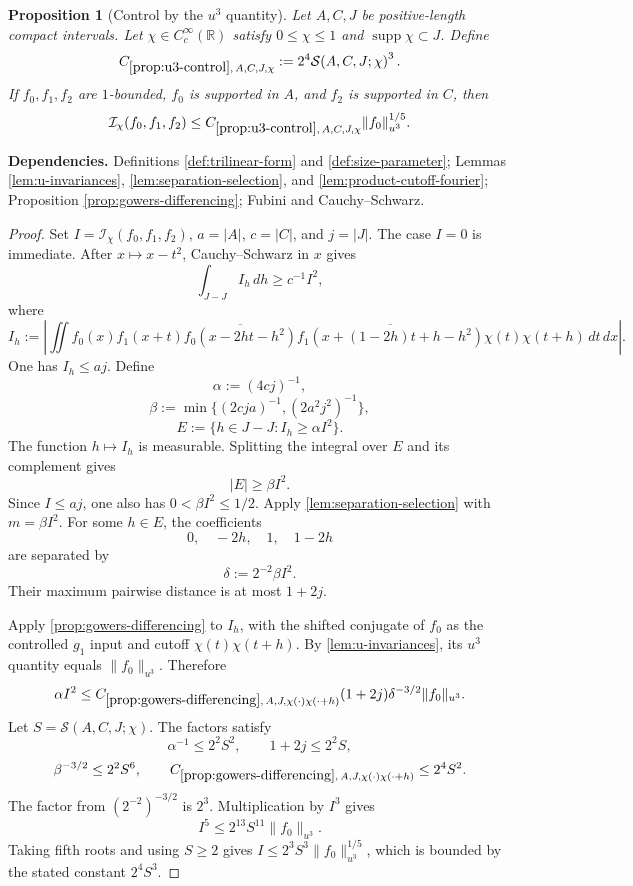 \documentclass[11pt]{article}
\newtheorem{proposition}[proposition]{Proposition}
\theoremstyle{definition}
\theoremstyle{remark}
\newcommand{\R}{\mathbb R}
\newcommand{\supp}{\operatorname{supp}}
\newcommand{\1}{\mathbf 1}
\newcommand{\dd}{\,d}
\newcommand{\Ichi}{\mathcal I_{\chi}}
\newcommand{\uNorm}[2]{\lVert #1\rVert_{u^{#2}}}
\newcommand{\uses}[1]{\par\smallskip\noindent\textbf{Dependencies.} #1\par\smallskip}
\newcommand{\Ssize}[2]{\mathcal S\!\left(#1;#2\right)}
\begin{document}
\begin{proposition}[Control by the $u^3$ quantity]\label{prop:u3-control}
Let $A,C,J$ be positive-length compact intervals.  Let $\chi\in C_c^\infty(\R)$ satisfy $0\leq\chi\leq1$ and $\supp\chi\subset J$.  Define
\[
C_{\ref{prop:u3-control},\,A,C,J,\chi}
:=
2^4\Ssize{A,C,J}{\chi}^{3}.
\]
If $f_0,f_1,f_2$ are $1$-bounded, $f_0$ is supported in $A$, and $f_2$ is supported in $C$, then
\[
\Ichi(f_0,f_1,f_2)
\leq
C_{\ref{prop:u3-control},\,A,C,J,\chi}
\uNorm{f_0}3^{1/5}.
\]
\end{proposition}

\uses{Definitions \ref{def:trilinear-form} and \ref{def:size-parameter}; Lemmas \ref{lem:u-invariances}, \ref{lem:separation-selection}, and \ref{lem:product-cutoff-fourier}; Proposition \ref{prop:gowers-differencing}; Fubini and Cauchy--Schwarz.}

\begin{proof}
Set $I=\Ichi(f_0,f_1,f_2)$, $a=\lvert A\rvert$, $c=\lvert C\rvert$, and $j=\lvert J\rvert$.  The case $I=0$ is immediate.  After $x\mapsto x-t^2$, Cauchy--Schwarz in $x$ gives
\[
\int_{J-J}I_h\dd h\geq c^{-1}I^2,
\]
where
\[
I_h:=
\left|
\iint
f_0(x)f_1(x+t)
\overline{f_0(x-2ht-h^2)}
\overline{f_1(x+(1-2h)t+h-h^2)}
\chi(t)\chi(t+h)
\dd t\dd x
\right|.
\]
One has $I_h\leq aj$.  Define
\[
\alpha:=(4cj)^{-1},
\]
\[
\beta:=\min\{(2cja)^{-1},(2a^2j^2)^{-1}\},
\]
\[
E:=\{h\in J-J:I_h\geq\alpha I^2\}.
\]
The function $h\mapsto I_h$ is measurable.  Splitting the integral over $E$ and its complement gives
\[
|E|\geq\beta I^2.
\]
Since $I\leq aj$, one also has $0<\beta I^2\leq1/2$.  Apply \cref{lem:separation-selection} with $m=\beta I^2$.  For some $h\in E$, the coefficients
\[
0,\quad -2h,\quad 1,\quad 1-2h
\]
are separated by
\[
\delta:=2^{-2}\beta I^2.
\]
Their maximum pairwise distance is at most $1+2j$.

Apply \cref{prop:gowers-differencing} to $I_h$, with the shifted conjugate of $f_0$ as the controlled $g_1$ input and cutoff $\chi(t)\chi(t+h)$.  By \cref{lem:u-invariances}, its $u^3$ quantity equals $\uNorm{f_0}3$.  Therefore
\[
\alpha I^2
\leq
C_{\ref{prop:gowers-differencing},\,A,J,\chi(\cdot)\chi(\cdot+h)}
(1+2j)\delta^{-3/2}\uNorm{f_0}3.
\]
Let $S=\Ssize{A,C,J}{\chi}$.  The factors satisfy
\[
\alpha^{-1}\leq2^2S^2,
\qquad
1+2j\leq2^2S,
\]
\[
\beta^{-3/2}\leq2^2S^6,
\qquad
C_{\ref{prop:gowers-differencing},\,A,J,\chi(\cdot)\chi(\cdot+h)}\leq2^4S^2.
\]
The factor from $(2^{-2})^{-3/2}$ is $2^3$.  Multiplication by $I^3$ gives
\[
I^5\leq2^{13}S^{11}\uNorm{f_0}3.
\]
Taking fifth roots and using $S\geq2$ gives
$I\leq2^3S^3\uNorm{f_0}3^{1/5}$, which is bounded by the stated constant $2^4S^3$.
\end{proof}
\end{document}
